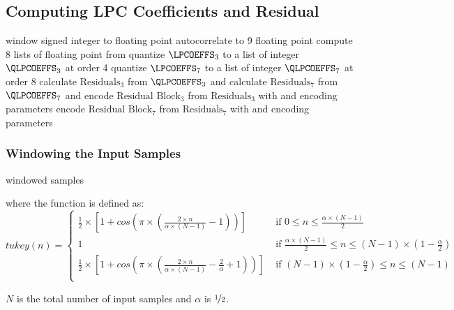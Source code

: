 \subsection{Computing LPC Coefficients and Residual}
{
window signed integer \SAMPLES to floating point \WINDOWED\;
autocorrelate \WINDOWED to 9 floating point \AUTOCORRELATIONS\;
compute 8 lists of floating point \LPCOEFFS from \AUTOCORRELATIONS\;
quantize $\text{\LPCOEFFS}_3$ to a list of integer $\text{\QLPCOEFFS}_3$ at order 4\;
quantize $\text{\LPCOEFFS}_7$ to a list of integer $\text{\QLPCOEFFS}_7$ at order 8\;
calculate $\text{Residuals}_3$ from $\text{\QLPCOEFFS}_3$ and \SAMPLES\;
calculate $\text{Residuals}_7$ from $\text{\QLPCOEFFS}_7$ and \SAMPLES\;
encode $\text{Residual Block}_3$ from $\text{Residuals}_3$ with \SAMPLESIZE and encoding parameters\;
encode $\text{Residual Block}_7$ from $\text{Residuals}_7$ with \SAMPLESIZE and encoding parameters\;
\EALGORITHM
}

\subsubsection{Windowing the Input Samples}
{
\Return windowed samples\;
\EALGORITHM
\par
\noindent
where the  function is defined as:
\begin{equation*}
tukey(n) =
\begin{cases}
\frac{1}{2} \times \left[1 + cos\left(\pi \times \left(\frac{2 \times n}{\alpha \times (N - 1)} - 1 \right)\right)\right] & \text{ if } 0 \leq n \leq \frac{\alpha \times (N - 1)}{2} \\
1 & \text{ if } \frac{\alpha \times (N - 1)}{2} \leq n \leq (N - 1) \times (1 - \frac{\alpha}{2}) \\
\frac{1}{2} \times \left[1 + cos\left(\pi \times \left(\frac{2 \times n}{\alpha \times (N - 1)} - \frac{2}{\alpha} + 1 \right)\right)\right] & \text{ if } (N - 1) \times (1 - \frac{\alpha}{2}) \leq n \leq (N - 1) \\
\end{cases}
\end{equation*}
\par
\noindent
$N$ is the total number of input samples and $\alpha$ is $\nicefrac{1}{2}$.
}
\par
\noindent
